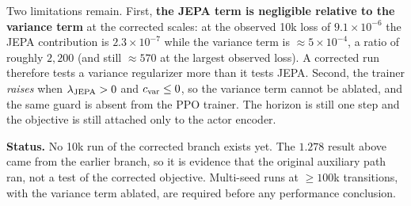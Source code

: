\documentclass[11pt]{article}
\begin{document}
Two limitations remain. First, \textbf{the JEPA term is negligible relative to
the variance term} at the corrected scales: at the observed 10k loss of
$9.1\times10^{-6}$ the JEPA contribution is $2.3\times10^{-7}$ while the
variance term is $\approx 5\times10^{-4}$, a ratio of roughly $2{,}200$ (and
still $\approx 570$ at the largest observed loss). A corrected run therefore
tests a variance regularizer more than it tests JEPA. Second, the trainer
\emph{raises} when $\lambda_{\rm JEPA}>0$ and $c_{\rm var}\le 0$, so the
variance term cannot be ablated, and the same guard is absent from the PPO
trainer. The horizon is still one step and the objective is still attached only
to the actor encoder.

\medskip
\noindent
\textbf{Status.} No 10k run of the corrected branch exists yet. The $1.278$
result above came from the earlier branch, so it is evidence that the original
auxiliary path ran, not a test of the corrected objective. Multi-seed runs at
$\ge 100$k transitions, with the variance term ablated, are required before any
performance conclusion.
\end{document}
